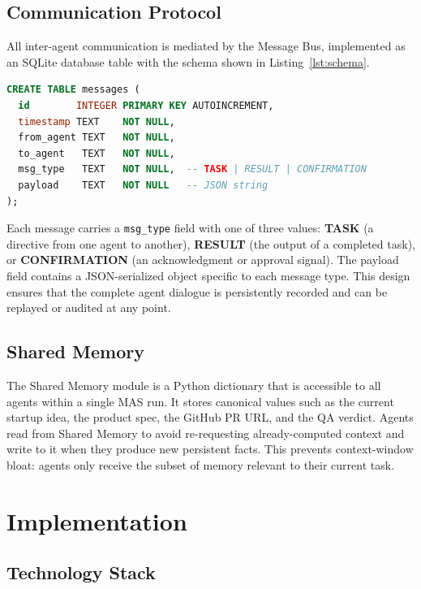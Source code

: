 \documentclass[conference]{IEEEtran}
\begin{document}
\subsection{Communication Protocol}

All inter-agent communication is mediated by the Message Bus, implemented as an SQLite database table with the schema shown in Listing~\ref{lst:schema}.

\begin{lstlisting}[language=SQL, caption={Message Bus Database Schema}, label={lst:schema}]
CREATE TABLE messages (
  id        INTEGER PRIMARY KEY AUTOINCREMENT,
  timestamp TEXT    NOT NULL,
  from_agent TEXT   NOT NULL,
  to_agent   TEXT   NOT NULL,
  msg_type   TEXT   NOT NULL,  -- TASK | RESULT | CONFIRMATION
  payload    TEXT   NOT NULL   -- JSON string
);
\end{lstlisting}

Each message carries a \texttt{msg\_type} field with one of three values: \textbf{TASK} (a directive from one agent to another), \textbf{RESULT} (the output of a completed task), or \textbf{CONFIRMATION} (an acknowledgment or approval signal). The payload field contains a JSON-serialized object specific to each message type. This design ensures that the complete agent dialogue is persistently recorded and can be replayed or audited at any point.

\subsection{Shared Memory}

The Shared Memory module is a Python dictionary that is accessible to all agents within a single MAS run. It stores canonical values such as the current startup idea, the product spec, the GitHub PR URL, and the QA verdict. Agents read from Shared Memory to avoid re-requesting already-computed context and write to it when they produce new persistent facts. This prevents context-window bloat: agents only receive the subset of memory relevant to their current task.

\section{Implementation}
\label{sec:impl}

\subsection{Technology Stack}
\end{document}
